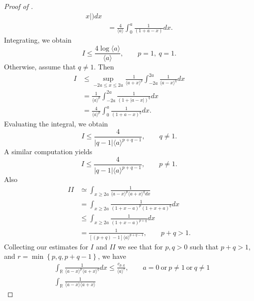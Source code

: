 \documentclass[12pt,reqno]{amsart}
\numberwithin{equation}{section}  %
\renewcommand{\cref}{\Cref}
\newcommand{\rr}{\mathbb{R}}
\begin{document}
\begin{proof}[Proof of \cref{lem:calc}]
\begin{equation*}
\begin{split}
{x
|)} d x
\\
& = \frac{4}{\langle a \rangle} \int_{0}^{a} \frac{1}{(1 + a -
x)} d x.
\end{split}
\end{equation*}
Integrating, we obtain
\begin{equation*}
I
\le 
\frac{4 \log \langle a \rangle}{\langle a \rangle}, \qquad p =1, \ q =1.
\end{equation*}
Otherwise, assume that $q \neq 1$. Then
\begin{equation*}
\begin{split}
I
& \le \sup_{-2a \le x \le 2a} \frac{1}{\langle a + x \rangle
^{p}} \int_{-2a}^{2a} \frac{1}{\langle a - x \rangle ^{q}} d x
\\
& = \frac{1}{\langle a \rangle ^{p}} \int_{-2a}^{2a} \frac{1}{(1 + | a -
x
|)^{q}} d x
\\
& = \frac{4}{\langle a \rangle ^{p}} \int_{0}^{a} \frac{1}{(1 + a -
x)^{q}} d x.
\end{split}
\end{equation*}
Evaluating the integral, we obtain
\begin{equation*}
I \le \frac{4}{|q-1| \langle a \rangle ^{p +q -1}}, \qquad q \neq 1.
\end{equation*}
A similar computation yields
\begin{equation*}
I \le \frac{4}{|q-1| \langle a \rangle ^{p +q -1}}, \qquad p \neq 1.
\end{equation*}
Also
\begin{equation*}
\begin{split}
II 
& \simeq \int_{x \ge 2a} \frac{1}{\langle a - x \rangle ^{p} \langle a
+ x \rangle ^{q} d x}
\\ 
& = \int_{x \ge 2a} \frac{1}{(1 + x - a)^{p} (1 + x +
a)^{q}} d x
\\
& \le \int_{x \ge 2a} \frac{1}{(1 + x -a)^{p+q}} d x
\\
& = \frac{1}{[(p + q)-1] \langle a \rangle ^{p+q -1}}, \qquad p + q > 1.
\end{split}
\end{equation*}
Collecting our estimates for $I$ and $II$ we see that for 
$p, q > 0$ such that $p +q >1$, and $r =\min\left\{p, q, p+q-1
\right\}$, we have 
\begin{align*}
& \int_{\rr} \frac{1}{\langle a - x \rangle ^{p} \langle a + x \rangle
^{q}} d x
\le \frac{c_{p,q}}{\langle a \rangle ^{r}}, \qquad a = 0 \ \text{or} \
p \neq 1 \ \text{or} \ q \neq 1
\\
& \int_{\rr} \frac{1}{\langle a - x \rangle  \langle a + x \rangle
}
\end{align*}
\end{proof}
\end{document}
